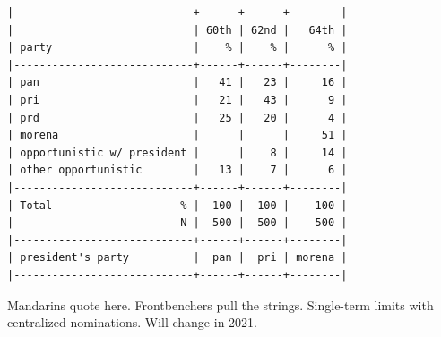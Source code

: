 \documentclass[letter,12pt]{article}
\begin{document}
\singlespacing
\begin{footnotesize}
\begin{verbatim}
|----------------------------+------+------+--------|
|                            | 60th | 62nd |   64th |
| party                      |    % |    % |      % |
|----------------------------+------+------+--------|
| pan                        |   41 |   23 |     16 |
| pri                        |   21 |   43 |      9 |
| prd                        |   25 |   20 |      4 |
| morena                     |      |      |     51 |
| opportunistic w/ president |      |    8 |     14 |
| other opportunistic        |   13 |    7 |      6 |
|----------------------------+------+------+--------|
| Total                    % |  100 |  100 |    100 |
|                          N |  500 |  500 |    500 |
|----------------------------+------+------+--------|
| president's party          |  pan |  pri | morena |
|----------------------------+------+------+--------|
\end{verbatim}
\end{footnotesize}
\doublespacing




Mandarins quote here. Frontbenchers pull the strings. Single-term limits with centralized nominations. Will change in 2021. 

\end{document}
